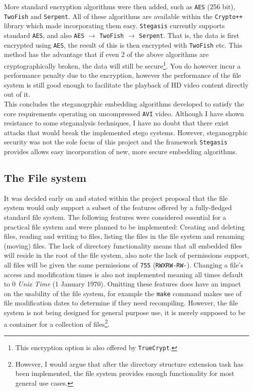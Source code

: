 \documentclass[paper=a4, fontsize=11pt,twoside]{scrartcl}    %
\numberwithin{table}{section}
\numberwithin{figure}{section}
\numberwithin{algorithm}{section}
\begin{document}
\noindent
More standard encryption algorithms were then added, such as \texttt{AES} (256 bit), \texttt{TwoFish} and \texttt{Serpent}. All of these algorithms are available within the \texttt{Crypto++} library which made incorporating them easy. \texttt{Stegasis} currently supports standard \texttt{AES}, and also \texttt{AES} $\rightarrow$ \texttt{TwoFish} $\rightarrow$ \texttt{Serpent}. That is, the data is first encrypted using \texttt{AES}, the result of this is then encrypted with \texttt{TwoFish} etc. This method has the advantage that if even 2 of the above algorithms are cryptographically broken, the data will still be secure\footnote{This encryption option is also offered by \texttt{TrueCrypt}.}. You do however incur a performance penalty due to the encryption, however the performance of the file system is still good enough to facilitate the playback of HD video content directly out of it.\\

\noindent
This concludes the steganogrphic embedding algorithms developed to satisfy the core requirements operating on uncompressed \texttt{AVI} video. Although I have shown resistance to some steganalysis techniques, I have no doubt that there exist attacks that would break the implemented stego systems. However, steganogrphic security was not the sole focus of this project and the framework \texttt{Stegasis} provides allows easy incorporation of new, more secure embedding algorithms.


\subsection{The File system}
\label{fsi}

It was decided early on and stated within the project proposal that the file system would only support a subset of the features offered by a fully-fledged standard file system. The following features were considered essential for a practical file system and were planned to be implemented: Creating and deleting files, reading and writing to files, listing the files in the file system and renaming (moving) files. The lack of directory functionality means that all embedded files will reside in the root of the file system, also note the lack of permissions support, all files will be given the same permissions of \texttt{755} (\texttt{RWXRW-RW-}). Changing a file's access and modification times is also not implemented meaning all times default to 0 \textit{Unix Time} (1 January 1970). Omitting these features does have an impact on the usability of the file system, for example the \texttt{make} command makes use of file modification dates to determine if they need recompiling. However, the file system is not being designed for general purpose use, it is merely supposed to be a container for a collection of files\footnote{However, I would argue that after the directory structure extension task has been implemented, the file system provides enough functionality for most general use cases.}.
\end{document}
